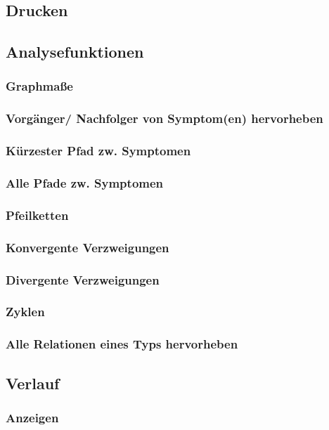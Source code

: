 \documentclass[enabledeprecatedfontcommands,fontsize=11pt,paper=a4,twoside]{scrartcl}
\newcounter{one}
\begin{document}
	\subsection{Drucken} \label{print}
	\subsection{Analysefunktionen} \label{analyse}
		\subsubsection{Graphmaße} 
		\subsubsection{Vorgänger/ Nachfolger von Symptom(en) hervorheben}
		\subsubsection{Kürzester Pfad zw. Symptomen}
		\subsubsection{Alle Pfade zw. Symptomen}
		\subsubsection{Pfeilketten}
		\subsubsection{Konvergente Verzweigungen}
		\subsubsection{Divergente Verzweigungen}
		\subsubsection{Zyklen}
		\subsubsection{Alle Relationen eines Typs hervorheben}		
	\subsection{Verlauf} \label{logs}
		\subsubsection{Anzeigen}
\end{document}
